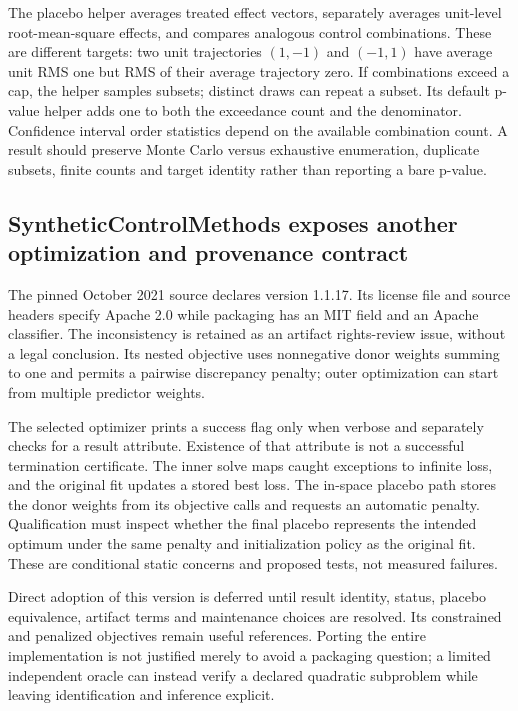 The placebo helper averages treated effect vectors, separately averages
unit-level root-mean-square effects, and compares analogous control
combinations. These are different targets: two unit trajectories $(1,-1)$
and $(-1,1)$ have average unit RMS one but RMS of their average trajectory
zero. If combinations exceed a cap, the helper samples subsets; distinct
draws can repeat a subset. Its default p-value helper adds one to both
the exceedance count and the denominator. Confidence interval order
statistics depend on the available combination count. A result should
preserve Monte Carlo versus exhaustive enumeration, duplicate subsets,
finite counts and target identity rather than reporting a bare p-value.
\citep{exec25_synthpy_sparse,exec25_synthpy_choice}

\subsection{SyntheticControlMethods exposes another optimization and provenance contract}
The pinned October 2021 source declares version 1.1.17. Its license file
and source headers specify Apache 2.0 while packaging has an MIT field
and an Apache classifier. The inconsistency is retained as an artifact
rights-review issue, without a legal conclusion. Its nested objective
uses nonnegative donor weights summing to one and permits a pairwise
discrepancy penalty; outer optimization can start from multiple predictor
weights.~\citep{exec25_synthpy_methods}

The selected optimizer prints a success flag only when verbose and separately
checks for a result attribute. Existence of that attribute is not a successful
termination certificate. The inner solve maps caught exceptions to infinite
loss, and the original fit updates a stored best loss. The in-space placebo
path stores the donor weights from its objective calls and requests an
automatic penalty. Qualification must inspect whether the final placebo
represents the intended optimum under the same penalty and initialization
policy as the original fit. These are conditional static concerns and
proposed tests, not measured failures.~\citep{exec25_synthpy_methods}

Direct adoption of this version is deferred until result identity, status,
placebo equivalence, artifact terms and maintenance choices are resolved.
Its constrained and penalized objectives remain useful references. Porting
the entire implementation is not justified merely to avoid a packaging
question; a limited independent oracle can instead verify a declared
quadratic subproblem while leaving identification and inference explicit.
\citep{exec25_synthpy_choice}

